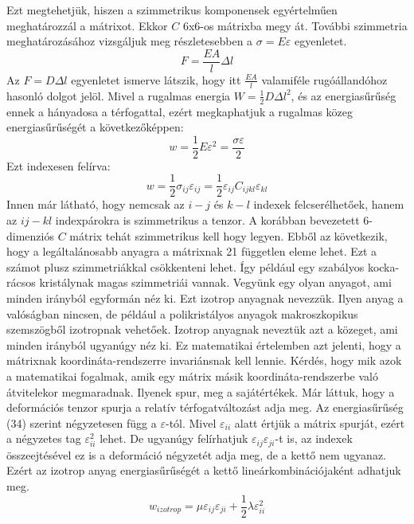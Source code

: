 \documentclass[a4paper,12pt]{article}
\begin{document}
Ezt megtehetjük, hiszen a szimmetrikus komponensek egyértelműen meghatározzál a mátrixot. Ekkor $C$ 6x6-os mátrixba megy át. További szimmetria meghatározásához vizsgáljuk meg részletesebben a $\sigma=E\varepsilon$ egyenletet.
\begin{equation}
F=\frac{EA}{l}\Delta l
\end{equation}
Az $F=D\Delta l$ egyenletet ismerve látszik, hogy itt $\frac{EA}{l}$ valamiféle rugóállandóhoz hasonló dolgot jelöl. Mivel a rugalmas energia $W=\frac{1}{2}D\Delta l^2$, és az energiasűrűség ennek a hányadosa a térfogattal, ezért megkaphatjuk a rugalmas közeg energiasűrűségét a következőképpen:
\begin{equation}
w=\frac{1}{2}E\varepsilon^2=\frac{\sigma\varepsilon}{2}
\end{equation}
Ezt indexesen felírva:
\begin{equation}
w=\frac{1}{2}\sigma_{ij}\varepsilon_{ij}=\frac{1}{2}\varepsilon_{ij}C_{ijkl}\varepsilon_{kl}
\end{equation}
Innen már látható, hogy nemcsak az $i-j$ és $k-l$ indexek felcserélhetőek, hanem az $ij-kl$ indexpárokra is szimmetrikus a tenzor. A korábban bevezetett 6-dimenziós $C$ mátrix tehát szimmetrikus kell hogy legyen. Ebből az következik, hogy a legáltalánosabb anyagra a mátrixnak 21 független eleme lehet. Ezt a számot plusz szimmetriákkal csökkenteni lehet. Így például egy szabályos kocka-rácsos kristálynak magas szimmetriái vannak. Vegyünk egy olyan anyagot, ami minden irányból egyformán néz ki. Ezt izotrop anyagnak nevezzük. Ilyen anyag a valóságban nincsen, de például a polikristályos anyagok makroszkopikus szemszögből izotropnak vehetőek.
Izotrop anyagnak neveztük azt a közeget, ami minden irányból ugyanúgy néz ki. Ez matematikai értelemben azt jelenti, hogy a mátrixnak koordináta-rendszerre invariánsnak kell lennie. Kérdés, hogy mik azok a matematikai fogalmak, amik egy mátrix másik koordináta-rendszerbe való átvitelekor megmaradnak. Ilyenek spur, meg a sajátértékek. Már láttuk, hogy a deformációs tenzor spurja a relatív térfogatváltozást adja meg. Az energiasűrűség (34) szerint négyzetesen függ a $\varepsilon$-tól. Mivel $\varepsilon_{ii}$ alatt értjük a mátrix spurját, ezért a négyzetes tag $\varepsilon_{ii}^2$ lehet. De ugyanúgy felírhatjuk $\varepsilon_{ij}\varepsilon_{ji}$-t is, az indexek összeejtésével ez is a deformáció négyzetét adja meg, de a kettő nem ugyanaz. Ezért az izotrop anyag energiasűrűségét a kettő lineárkombinációjaként adhatjuk meg.
\begin{equation}
w_{izotrop}=\mu\varepsilon_{ij}\varepsilon_{ji}+\frac{1}{2}\lambda\varepsilon_{ii}^2
\end{equation}
\end{document}
